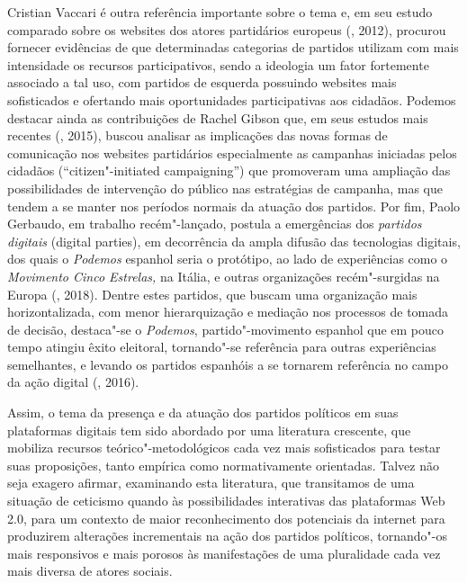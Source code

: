 Cristian Vaccari é outra referência importante sobre o tema e, em seu
estudo comparado sobre os websites dos atores partidários europeus
(, 2012), procurou fornecer evidências de que determinadas
categorias de partidos utilizam com mais intensidade os recursos
participativos, sendo a ideologia um fator fortemente associado a tal
uso, com partidos de esquerda possuindo websites mais sofisticados e
ofertando mais oportunidades participativas aos cidadãos. Podemos
destacar ainda as contribuições de Rachel Gibson que, em seus estudos
mais recentes (, 2015), buscou analisar as implicações das novas
formas de comunicação nos websites partidários especialmente as
campanhas iniciadas pelos cidadãos (``citizen"-initiated campaigning'')
que promoveram uma ampliação das possibilidades de intervenção do
público nas estratégias de campanha, mas que tendem a se manter nos
períodos normais da atuação dos partidos. Por fim, Paolo Gerbaudo, em
trabalho recém"-lançado, postula a emergências dos \emph{partidos
digitais} (digital parties), em decorrência da ampla difusão das
tecnologias digitais, dos quais o \emph{Podemos} espanhol seria o
protótipo, ao lado de experiências como o \emph{Movimento Cinco
Estrelas,} na Itália, e outras organizações recém"-surgidas na Europa
(, 2018). Dentre estes partidos, que buscam uma organização mais
horizontalizada, com menor hierarquização e mediação nos processos de
tomada de decisão, destaca"-se o \emph{Podemos}, partido"-movimento
espanhol que em pouco tempo atingiu êxito eleitoral, tornando"-se
referência para outras experiências semelhantes, e levando os partidos
espanhóis a se tornarem referência no campo da ação digital (,
2016).

Assim, o tema da presença e da atuação dos partidos políticos em suas
plataformas digitais tem sido abordado por uma literatura crescente, que
mobiliza recursos teórico"-metodológicos cada vez mais sofisticados para
testar suas proposições, tanto empírica como normativamente orientadas.
Talvez não seja exagero afirmar, examinando esta literatura, que
transitamos de uma situação de ceticismo quando às possibilidades
interativas das plataformas Web 2.0, para um contexto de maior
reconhecimento dos potenciais da internet para produzirem alterações
incrementais na ação dos partidos políticos, tornando"-os mais
responsivos e mais porosos às manifestações de uma pluralidade cada vez
mais diversa de atores sociais.

